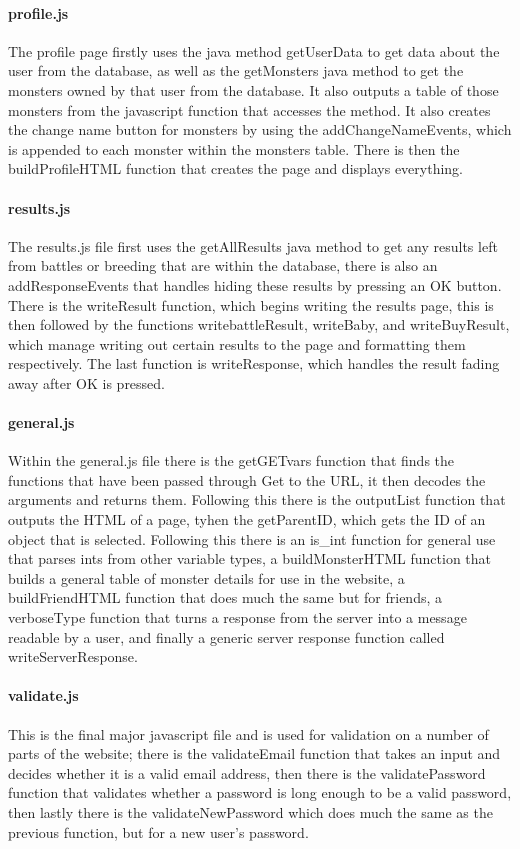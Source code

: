 \documentclass{project}
\begin{document}
\paragraph{profile.js}
The profile page firstly uses the java method getUserData to get data about the user from the database, as well as the getMonsters java method to get the monsters owned by that user from the database. It also outputs a table of those monsters from the javascript function that accesses the method. It also creates the change name button for monsters by using the addChangeNameEvents, which is appended to each monster within the monsters table. There is then the buildProfileHTML function that creates the page and displays everything.

\paragraph{results.js}
The results.js file first uses the getAllResults java method to get any results left from battles or breeding that are within the database, there is also an addResponseEvents that handles hiding these results by pressing an OK button. There is the writeResult function, which begins writing the results page, this is then followed by the functions writebattleResult, writeBaby, and writeBuyResult, which manage writing out certain results to the page and formatting them respectively. The last function is writeResponse, which handles the result fading away after OK is pressed.

\paragraph{general.js}
Within the general.js file there is the getGETvars function that finds the functions that have been passed through Get to the URL, it then decodes the arguments and returns them. Following this there is the outputList function that outputs the HTML of a page, tyhen the getParentID, which gets the ID of an object that is selected. Following this there is an is_int function for general use that parses ints from other variable types, a buildMonsterHTML function that builds a general table of monster details for use in the website, a buildFriendHTML function that does much the same but for friends, a verboseType function that turns a response from the server into a message readable by a user, and finally a generic server response function called writeServerResponse.

\paragraph{validate.js}
This is the final major javascript file and is used for validation on a number of parts of the website; there is the validateEmail function that takes an input and decides whether it is a valid email address, then there is the validatePassword function that validates whether a password is long enough to be a valid password, then lastly there is the validateNewPassword which does much the same as the previous function, but for a new user's password. 
\end{document}
